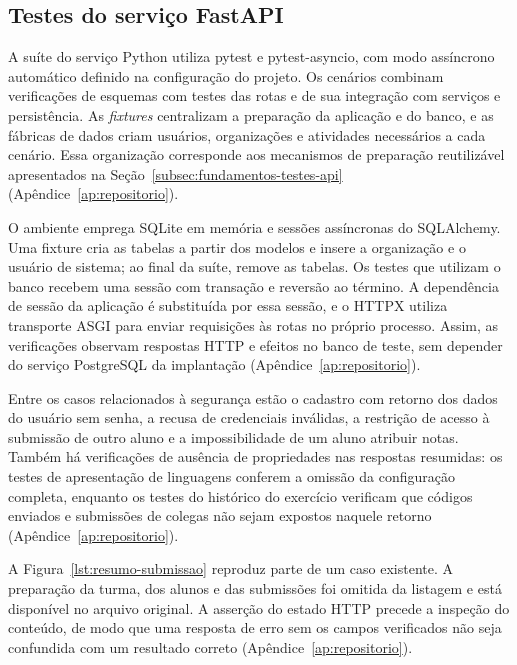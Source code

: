 \subsection{Testes do serviço FastAPI}
\label{subsec:testes-backend}

A suíte do serviço Python utiliza pytest e pytest-asyncio, com modo assíncrono automático definido na configuração do projeto. Os cenários combinam verificações de esquemas com testes das rotas e de sua integração com serviços e persistência. As \textit{fixtures} centralizam a preparação da aplicação e do banco, e as fábricas de dados criam usuários, organizações e atividades necessários a cada cenário. Essa organização corresponde aos mecanismos de preparação reutilizável apresentados na Seção~\ref{subsec:fundamentos-testes-api} \cite{pytest2026fixtures,pytestasyncio2026} (Apêndice~\ref{ap:repositorio}).

O ambiente emprega SQLite em memória e sessões assíncronas do SQLAlchemy. Uma fixture cria as tabelas a partir dos modelos e insere a organização e o usuário de sistema; ao final da suíte, remove as tabelas. Os testes que utilizam o banco recebem uma sessão com transação e reversão ao término. A dependência de sessão da aplicação é substituída por essa sessão, e o HTTPX utiliza transporte ASGI para enviar requisições às rotas no próprio processo. Assim, as verificações observam respostas HTTP e efeitos no banco de teste, sem depender do serviço PostgreSQL da implantação \cite{fastapi2026async,fastapi2026overrides} (Apêndice~\ref{ap:repositorio}).

Entre os casos relacionados à segurança estão o cadastro com retorno dos dados do usuário sem senha, a recusa de credenciais inválidas, a restrição de acesso à submissão de outro aluno e a impossibilidade de um aluno atribuir notas. Também há verificações de ausência de propriedades nas respostas resumidas: os testes de apresentação de linguagens conferem a omissão da configuração completa, enquanto os testes do histórico do exercício verificam que códigos enviados e submissões de colegas não sejam expostos naquele retorno (Apêndice~\ref{ap:repositorio}).

A Figura~\ref{lst:resumo-submissao} reproduz parte de um caso existente. A preparação da turma, dos alunos e das submissões foi omitida da listagem e está disponível no arquivo original. A asserção do estado HTTP precede a inspeção do conteúdo, de modo que uma resposta de erro sem os campos verificados não seja confundida com um resultado correto (Apêndice~\ref{ap:repositorio}).

